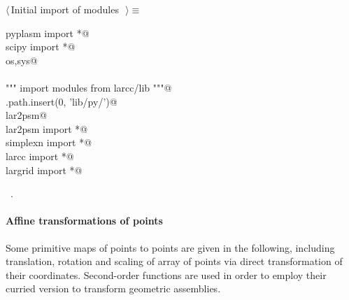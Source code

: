 \documentclass[11pt,oneside]{article}	%
\begin{document}
\begin{flushleft} \small \label{scrap50}
$\langle\,$Initial import of modules\nobreak\ {\footnotesize {}}$\,\rangle\equiv$
\vspace{-1ex}
\begin{list}{}{} \item
\mbox{}\verb@from pyplasm import *@\\
\mbox{}\verb@from scipy import *@\\
\mbox{}\verb@import os,sys@\\
\mbox{}\verb@@\\
\mbox{}\verb@""" import modules from larcc/lib """@\\
\mbox{}\verb@sys.path.insert(0, 'lib/py/')@\\
\mbox{}\verb@import lar2psm@\\
\mbox{}\verb@from lar2psm import *@\\
\mbox{}\verb@from simplexn import *@\\
\mbox{}\verb@from larcc import *@\\
\mbox{}\verb@from largrid import *@\\
\mbox{}\verb@@{\NWsep}
\end{list}
\vspace{-1ex}
\footnotesize\addtolength{\baselineskip}{-1ex}
\begin{list}{}{\setlength{\itemsep}{-\parsep}\setlength{\itemindent}{-\leftmargin}}
\item \NWtxtMacroRefIn\ .
\end{list}
\end{flushleft}


\paragraph{Affine transformations of points} Some primitive maps of points to points are given in the following, including translation, rotation and scaling of array of points via direct transformation of their coordinates. Second-order functions are used in order to employ their curried version to transform geometric assemblies.
\end{document}
